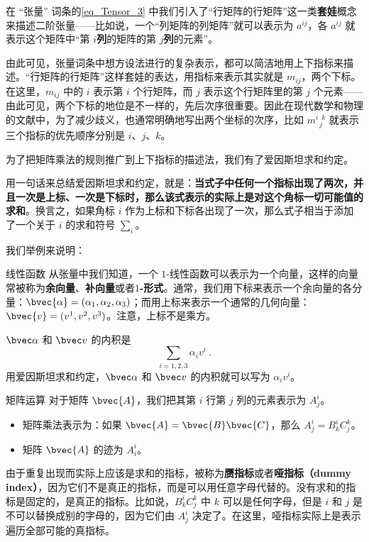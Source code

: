 在 “张量” 词条的\autoref{eq_Tensor_3} 中我们引入了“行矩阵的行矩阵”这一类\textbf{套娃}概念来描述二阶张量——比如说，一个“列矩阵的列矩阵”就可以表示为 $a^{ij}$，各 $a^{ij}$ 就表示这个矩阵中“第 $i$\textbf{列}的矩阵的第 $j$\textbf{列}的元素”。

由此可见，张量词条中想方设法进行的复杂表示，都可以简洁地用上下指标来描述。“行矩阵的行矩阵”这样套娃的表达，用指标来表示其实就是 $m_{ij}$，两个下标。在这里，$m_{ij}$ 中的 $i$ 表示第 $i$ 个行矩阵，而 $j$ 表示这个行矩阵里的第 $j$ 个元素——由此可见，两个下标的地位是不一样的，先后次序很重要。因此在现代数学和物理的文献中，为了减少歧义，也通常明确地写出两个坐标的次序，比如 $m^{i\phantom{1}k}_{\phantom{1}j}$ 就表示三个指标的优先顺序分别是 $i$、$j$、$k$。

为了把矩阵乘法的规则推广到上下指标的描述法，我们有了爱因斯坦求和约定。

用一句话来总结爱因斯坦求和约定，就是：\textbf{当式子中任何一个指标出现了两次，并且一次是上标、一次是下标时，那么该式表示的实际上是对这个角标一切可能值的求和}。换言之，如果角标 $i$ 作为上标和下标各出现了一次，那么式子相当于添加了一个关于 $i$ 的求和符号 $\sum_i$。

我们举例来说明：

\begin{example}{线性函数}
从张量中我们知道，一个 $1$-线性函数可以表示为一个向量，这样的向量常被称为\textbf{余向量}、\textbf{补向量}或者\textbf{$1$-形式}。通常，我们用下标来表示一个余向量的各分量：$\bvec{\alpha}=(\alpha_1, \alpha_2, \alpha_3)$；而用上标来表示一个通常的几何向量：$\bvec{v}=(v^1, v^2, v^3)$。注意，上标不是乘方。

$\bvec\alpha$ 和 $\bvec v$ 的内积是$$\sum\limits_{i=1, 2, 3}\alpha_i v^i~.$$
用爱因斯坦求和约定，$\bvec\alpha$ 和 $\bvec v$ 的内积就可以写为 $\alpha_i v^i$。
\end{example}

\begin{example}{矩阵运算}
对于矩阵 $\bvec{A}$，我们把其第 $i$ 行第 $j$ 列的元素表示为 $A^i_j$。
\begin{itemize}
\item 矩阵乘法表示为：如果 $\bvec{A}=\bvec{B}\bvec{C}$，那么 $A^i_j=B^i_k C^k_j$。
\item 矩阵 $\bvec{A}$ 的迹为 $A^i_i$。

\end{itemize}
\end{example}

由于重复出现而实际上应该是求和的指标，被称为\textbf{赝指标}或者\textbf{哑指标（dummy index）}，因为它们不是真正的指标，而是可以用任意字母代替的。没有求和的指标是固定的，是真正的指标。比如说，$B^i_k C^k_j$ 中 $k$ 可以是任何字母，但是 $i$ 和 $j$ 是不可以替换成别的字母的，因为它们由 $A^i_j$ 决定了。在这里，哑指标实际上是表示遍历全部可能的真指标。


